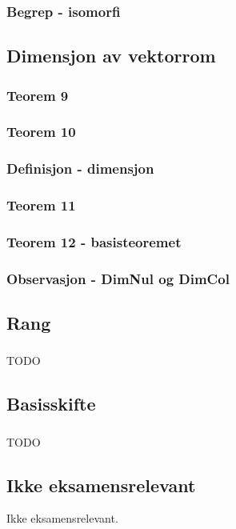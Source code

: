 \documentclass{article}
\begin{document}
      \subsubsection{Begrep - isomorfi}
        
    \subsection{Dimensjon av vektorrom}
      \subsubsection{Teorem 9}
        
      \subsubsection{Teorem 10}
        
      \subsubsection{Definisjon - dimensjon}
        
      \subsubsection{Teorem 11}
        
      \subsubsection{Teorem 12 - basisteoremet}
        
      \subsubsection{Observasjon - DimNul og DimCol}
        
    \subsection{Rang}
      \subsubsection{}
        TODO
    \subsection{Basisskifte}
      \subsubsection{}
        TODO
    \subsection{Ikke eksamensrelevant}
      Ikke eksamensrelevant.
\end{document}

